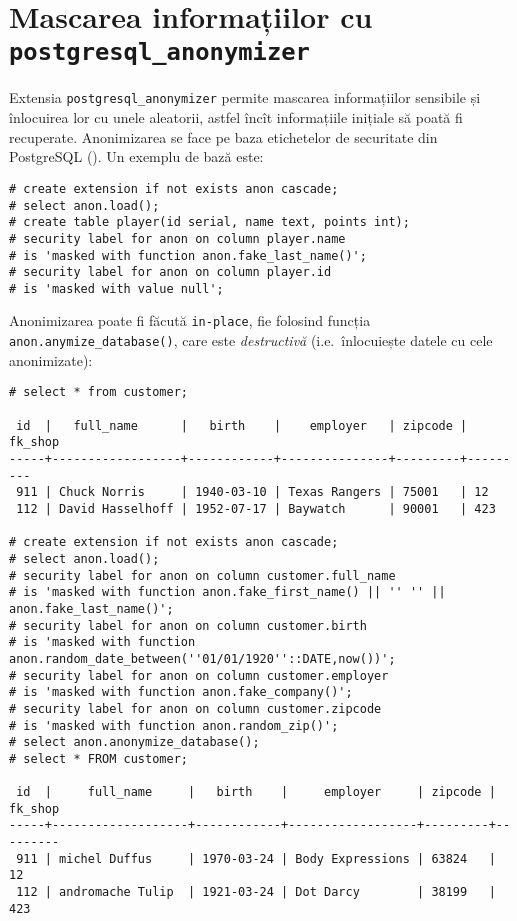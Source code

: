 \section{Mascarea informațiilor cu \texttt{postgresql\_anonymizer}}

Extensia \texttt{postgresql\_anonymizer} permite mascarea informațiilor
sensibile și înlocuirea lor cu unele aleatorii, astfel încît informațiile
inițiale să poată fi recuperate. Anonimizarea se face pe baza etichetelor
de securitate din PostgreSQL (\cite{psqlsecl}). Un exemplu de bază este:
{
  \small
\begin{verbatim}
# create extension if not exists anon cascade;
# select anon.load();
# create table player(id serial, name text, points int);
# security label for anon on column player.name 
# is 'masked with function anon.fake_last_name()';
# security label for anon on column player.id
# is 'masked with value null';
\end{verbatim}
}

Anonimizarea poate fi făcută \texttt{in-place}, fie folosind funcția
\texttt{anon.anymize\_database()}, care este \emph{destructivă} (i.e.\ înlocuiește
datele cu cele anonimizate):
{
  \small
\begin{verbatim}
# select * from customer;

 id  |   full_name      |   birth    |    employer   | zipcode | fk_shop
-----+------------------+------------+---------------+---------+---------
 911 | Chuck Norris     | 1940-03-10 | Texas Rangers | 75001   | 12
 112 | David Hasselhoff | 1952-07-17 | Baywatch      | 90001   | 423

# create extension if not exists anon cascade;
# select anon.load();
# security label for anon on column customer.full_name 
# is 'masked with function anon.fake_first_name() || '' '' || anon.fake_last_name()';
# security label for anon on column customer.birth   
# is 'masked with function anon.random_date_between(''01/01/1920''::DATE,now())';
# security label for anon on column customer.employer
# is 'masked with function anon.fake_company()';
# security label for anon on column customer.zipcode
# is 'masked with function anon.random_zip()';
# select anon.anonymize_database();
# select * FROM customer;

 id  |     full_name     |   birth    |     employer     | zipcode | fk_shop
-----+-------------------+------------+------------------+---------+---------
 911 | michel Duffus     | 1970-03-24 | Body Expressions | 63824   | 12
 112 | andromache Tulip  | 1921-03-24 | Dot Darcy        | 38199   | 423
\end{verbatim}
}

